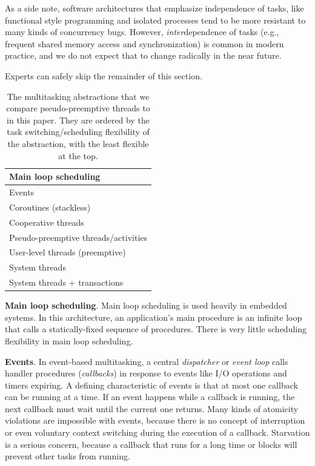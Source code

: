 \documentclass[9pt,preprint]{sigplanconf}
\begin{document}
As a side note, software architectures that emphasize independence of tasks, like functional style programming and isolated processes tend to be more resistant to many kinds of concurrency bugs.
However, \emph{inter}dependence of tasks (e.g., frequent shared memory access and synchronization) is common in modern practice, and we do not expect that to change radically in the near future.

Experts can safely skip the remainder of this section.

\begin{table}
  \centering
  \begin{tabular}{|l|}
    \hline
    Main loop scheduling \\
    \hline
    Events \\
    \hline
    Coroutines (stackless) \\
    \hline
    Cooperative threads \\
    \hline
    Pseudo-preemptive threads/activities \\
    \hline
    User-level threads (preemptive) \\
    \hline
    System threads \\
    \hline
    System threads + transactions \\
    \hline
  \end{tabular}
  \caption{The multitasking abstractions that we compare pseudo-preemptive threads to in this paper.
  They are ordered by the task switching/scheduling flexibility of the abstraction, with the least flexible at the top.}
  \label{table:abstractions}
\end{table}

\textbf{Main loop scheduling}.
Main loop scheduling is used heavily in embedded systems.
In this architecture, an application's main procedure is an infinite loop that calls a statically-fixed sequence of procedures.
There is very little scheduling flexibility in main loop scheduling.

\textbf{Events}.
In event-based multitasking, a central \emph{dispatcher} or \emph{event loop} calls handler procedures (\emph{callbacks}) in response to events like I/O operations and timers expiring.
A defining characteristic of events is that at most one callback can be running at a time.
If an event happens while a callback is running, the next callback must wait until the current one returns.
Many kinds of atomicity violations are impossible with events, because there is no concept of interruption or even voluntary context switching during the execution of a callback.
Starvation is a serious concern, because a callback that runs for a long time or blocks will prevent other tasks from running.
\end{document}
